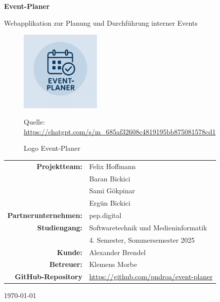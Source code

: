 \documentclass[a4paper,12pt]{article}
\begin{document}

\begin{titlepage}
    \centering

    \vspace*{1.5cm}

    {\LARGE\bfseries Event-Planer\par}
    \vspace{0.3cm}
    {\normalsize Webapplikation zur Planung und Durchführung interner Events\par}

    \vspace{0.5cm}

    \begin{figure}[H]
        \centering
        \includegraphics[width=0.35\textwidth]{Abbildungen/logo.png}
        \caption{Logo Event-Planer}
        \label{fig:logo}
        {\footnotesize Quelle: \url{https://chatgpt.com/s/m_685af32608c4819195bb875081578cd1}}
    \end{figure}

    \vspace{1.2cm}

    {\normalsize
    \begin{tabular}{rl}
        \textbf{Projektteam:}      & Felix Hoffmann \\
                                   & Baran Bickici \\
                                   & Sami Gökpinar \\
                                   & Ergün Bickici \\[0.5em]
        \textbf{Partnerunternehmen:} & pep.digital \\[0.5em]
        \textbf{Studiengang:}      & Softwaretechnik und Medieninformatik \\
                                   & 4. Semester, Sommersemester 2025 \\[0.5em]
        \textbf{Kunde:}            & Alexander Brendel \\[0.5em]
        \textbf{Betreuer:}         & Klemens Morbe \\[0.5em]
        \textbf{GitHub-Repository} & \url{https://github.com/pndroa/event-planer}
    \end{tabular}
    }

    \vfill
    {\small \today}
\end{titlepage}
\end{document}
